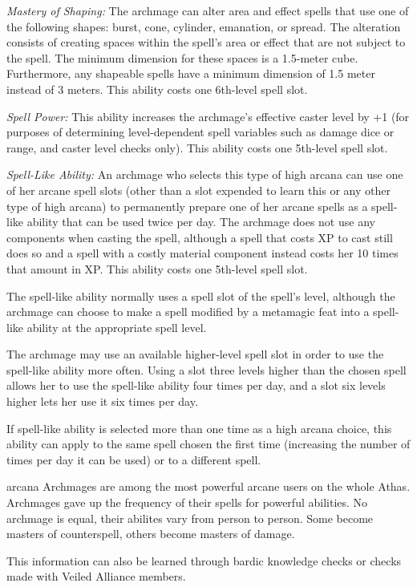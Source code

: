 {\textit{Mastery of Shaping:} The archmage can alter area and effect spells that use one of the following shapes: burst, cone, cylinder, emanation, or spread. The alteration consists of creating spaces within the spell's area or effect that are not subject to the spell. The minimum dimension for these spaces is a 1.5-meter cube. Furthermore, any shapeable spells have a minimum dimension of 1.5 meter instead of 3 meters. This ability costs one 6th-level spell slot.

\textit{Spell Power:} This ability increases the archmage's effective caster level by +1 (for purposes of determining level-dependent spell variables such as damage dice or range, and caster level checks only). This ability costs one 5th-level spell slot.

\textit{Spell-Like Ability:} An archmage who selects this type of high arcana can use one of her arcane spell slots (other than a slot expended to learn this or any other type of high arcana) to permanently prepare one of her arcane spells as a spell-like ability that can be used twice per day. The archmage does not use any components when casting the spell, although a spell that costs XP to cast still does so and a spell with a costly material component instead costs her 10 times that amount in XP. This ability costs one 5th-level spell slot.

The spell-like ability normally uses a spell slot of the spell's level, although the archmage can choose to make a spell modified by a metamagic feat into a spell-like ability at the appropriate spell level.

The archmage may use an available higher-level spell slot in order to use the spell-like ability more often. Using a slot three levels higher than the chosen spell allows her to use the spell-like ability four times per day, and a slot six levels higher lets her use it six times per day.

If spell-like ability is selected more than one time as a high arcana choice, this ability can apply to the same spell chosen the first time (increasing the number of times per day it can be used) or to a different spell.
}
{}
{arcana}
{Archmages are among the most powerful arcane users on the whole Athas.}
{Archmages gave up the frequency of their spells for powerful abilities.}
{No archmage is equal, their abilites vary from person to person. Some become masters of counterspell, others become masters of damage.}

This information can also be learned through bardic knowledge checks or  checks made with Veiled Alliance members.